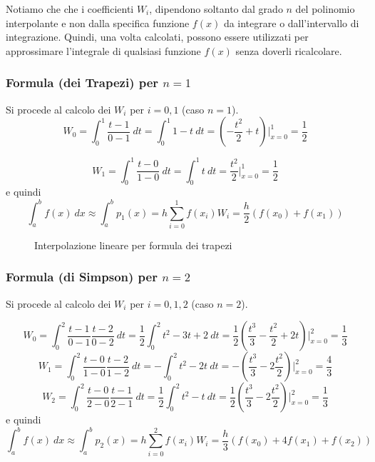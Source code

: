 \documentclass{article}
\begin{document}
Notiamo che che i coefficienti $W_i$, dipendono soltanto dal grado $n$ del
polinomio interpolante e non dalla specifica funzione $f(x)$  da integrare o
dall'intervallo di integrazione. Quindi, una volta calcolati, possono essere
utilizzati  per approssimare l'integrale di qualsiasi funzione $f(x)$ senza
doverli ricalcolare.
\subsubsection{Formula (dei Trapezi) per $n=1$}
Si procede al calcolo dei $W_i$ per $i=0,1$ (caso $n=1$).
$$W_0=\displaystyle\int_{0}^{1}\frac{t-1}{0-1}\
dt=\displaystyle\int_{0}^{1}1-t\ dt=\left(-\frac{t^2}{2}+t
\right)\bigg|_{x=0}^{1}=\frac{1}{2}$$

$$W_1=\displaystyle\int_{0}^{1}\frac{t-0}{1-0}\
dt=\displaystyle\int_{0}^{1}t\ dt=\frac{t^2}{2}
\bigg|_{x=0}^{1}=\frac{1}{2}$$
e quindi 
$$\displaystyle\int_{a}^{b}f(x)\
dx\approx\displaystyle\int_{a}^{b}p_1(x)=h
\displaystyle\sum_{i=0}^{1}f(x_i)W_i=\frac{h}{2}(f(x_0)+f(x_1))$$

\begin{figure}[!ht]
    \centering
    \caption{Interpolazione lineare per formula dei trapezi}
\end{figure}
\newpage
\subsubsection{Formula (di Simpson) per $n=2$}
Si procede al calcolo dei $W_i$ per $i=0,1,2$ (caso $n=2$).

$$W_0=\displaystyle\int_{0}^{2}\frac{t-1}{0-1}\frac{t-2}{0-2}\
dt=\frac{1}{2}\displaystyle\int_{0}^{2}t^2-3t+2\
dt=\frac{1}{2}\left(\frac{t^3}{3}-\frac{t^2}{2}+2t
\right)\bigg|_{x=0}^{2}=\frac{1}{3}$$
$$W_1=\displaystyle\int_{0}^{2}\frac{t-0}{1-0}\frac{t-2}{1-2}\
dt=-\displaystyle\int_{0}^{2}t^2-2t\
dt=-\left(\frac{t^3}{3}-2\frac{t^2}{2}
\right)\bigg|_{x=0}^{2}=\frac{4}{3}$$
$$W_2=\displaystyle\int_{0}^{2}\frac{t-0}{2-0}\frac{t-1}{2-1}\
dt=\frac{1}{2}\displaystyle\int_{0}^{2}t^2-t\
dt=\frac{1}{2}\left(\frac{t^3}{3}-2\frac{t^2}{2}
\right)\bigg|_{x=0}^{2}=\frac{1}{3}$$
e quindi 
$$\displaystyle\int_{a}^{b}f(x)\
dx\approx\displaystyle\int_{a}^{b}p_2(x)=h
\displaystyle\sum_{i=0}^{2}f(x_i)W_i=\frac{h}{3}(f(x_0)+4f(x_1)+f(x_2))$$
\end{document}
